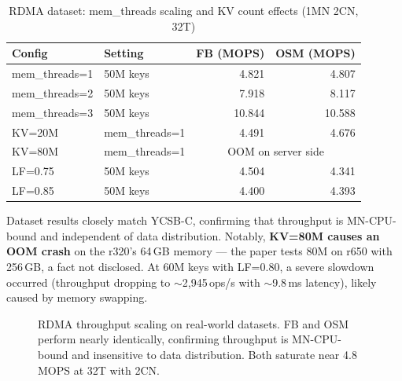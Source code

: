 \documentclass[11pt,a4paper]{article}
\begin{document}
\begin{table}[H]
\centering
\caption{RDMA dataset: mem\_threads scaling and KV count effects (1MN 2CN, 32T)}
\label{tab:rdma-dataset-extra}
\small
\begin{tabular}{@{}llrr@{}}
\toprule
\textbf{Config} & \textbf{Setting} & \textbf{FB (MOPS)} & \textbf{OSM (MOPS)} \\
\midrule
mem\_threads=1  & 50M keys & 4.821 & 4.807 \\
mem\_threads=2  & 50M keys & 7.918 & 8.117 \\
mem\_threads=3  & 50M keys & 10.844 & 10.588 \\
\midrule
KV=20M & mem\_threads=1  & 4.491 & 4.676 \\
KV=80M & mem\_threads=1  & \multicolumn{2}{c}{OOM on server side} \\
\midrule
LF=0.75 & 50M keys & 4.504 & 4.341 \\
LF=0.85 & 50M keys & 4.400 & 4.393 \\
\bottomrule
\end{tabular}
\end{table}

Dataset results closely match YCSB-C, confirming that throughput is MN-CPU-bound and independent of data distribution. Notably, \textbf{KV=80M causes an OOM crash} on the r320's 64\,GB memory --- the paper tests 80M on r650 with 256\,GB, a fact not disclosed. At 60M keys with LF=0.80, a severe slowdown occurred (throughput dropping to $\sim$2,945\,ops/s with $\sim$9.8\,ms latency), likely caused by memory swapping.

\begin{figure}[H]
\centering
{}
\caption{RDMA throughput scaling on real-world datasets. FB and OSM perform nearly identically, confirming throughput is MN-CPU-bound and insensitive to data distribution. Both saturate near 4.8\,MOPS at 32T with 2CN.}
\label{fig:rdma-dataset-scaling}
\end{figure}
\end{document}
